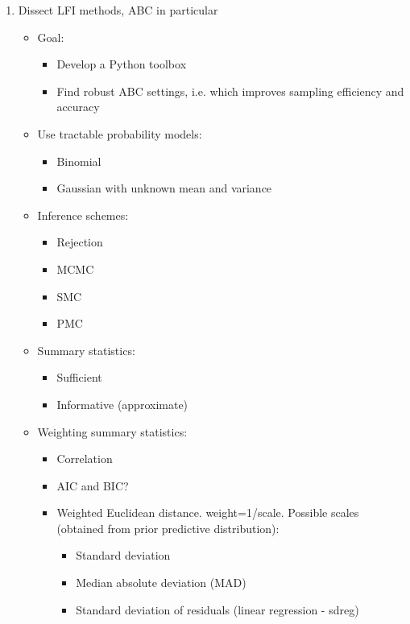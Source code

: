 \begin{enumerate}
    \item Dissect LFI methods, ABC in particular
    \begin{itemize}
        \item Goal:
        \begin{itemize}
            \item Develop a Python toolbox 
            \item Find robust ABC settings, i.e. which improves sampling efficiency and accuracy
        \end{itemize}
        \item Use tractable probability models:
        \begin{itemize}
            \item Binomial 
            \item Gaussian with unknown mean and variance 
        \end{itemize}
        \item Inference schemes:
        \begin{itemize}
            \item Rejection 
            \item MCMC
            \item SMC 
            \item PMC
        \end{itemize}
        \item Summary statistics:  
        \begin{itemize}
            \item Sufficient
            \item Informative (approximate)
        \end{itemize}
        \item Weighting summary statistics:
        \begin{itemize}
            \item Correlation
            \item AIC and BIC? 
            \item Weighted Euclidean distance. weight=1/scale. Possible scales (obtained from prior predictive distribution):
            \begin{itemize}
                \item Standard deviation 
                \item Median absolute deviation (MAD)
                \item Standard deviation of residuals (linear regression - sdreg)

\end{itemize}
\end{itemize}
\end{itemize}
\end{enumerate}
